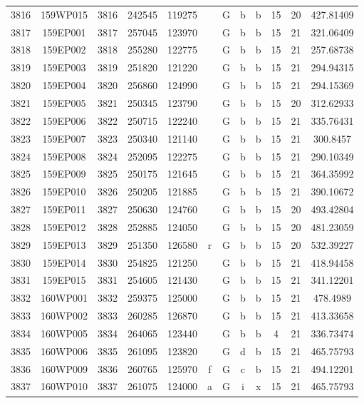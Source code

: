 \begin{tabular}{|*{12}{c|}}
3816 & 159WP015 & 3816 & 242545 & 119275 &  & G & b & b & 15 & 20 & 427.81409 \\ 
3817 & 159EP001 & 3817 & 257045 & 123970 &  & G & b & b & 15 & 21 & 321.06409 \\ 
3818 & 159EP002 & 3818 & 255280 & 122775 &  & G & b & b & 15 & 21 & 257.68738 \\ 
3819 & 159EP003 & 3819 & 251820 & 121220 &  & G & b & b & 15 & 21 & 294.94315 \\ 
3820 & 159EP004 & 3820 & 256860 & 124990 &  & G & b & b & 15 & 21 & 294.15369 \\ 
3821 & 159EP005 & 3821 & 250345 & 123790 &  & G & b & b & 15 & 20 & 312.62933 \\ 
3822 & 159EP006 & 3822 & 250715 & 122240 &  & G & b & b & 15 & 21 & 335.76431 \\ 
3823 & 159EP007 & 3823 & 250340 & 121140 &  & G & b & b & 15 & 21 & 300.8457 \\ 
3824 & 159EP008 & 3824 & 252095 & 122275 &  & G & b & b & 15 & 21 & 290.10349 \\ 
3825 & 159EP009 & 3825 & 250175 & 121645 &  & G & b & b & 15 & 21 & 364.35992 \\ 
3826 & 159EP010 & 3826 & 250205 & 121885 &  & G & b & b & 15 & 21 & 390.10672 \\ 
3827 & 159EP011 & 3827 & 250630 & 124760 &  & G & b & b & 15 & 20 & 493.42804 \\ 
3828 & 159EP012 & 3828 & 252885 & 124050 &  & G & b & b & 15 & 20 & 481.23059 \\ 
3829 & 159EP013 & 3829 & 251350 & 126580 & r & G & b & b & 15 & 20 & 532.39227 \\ 
3830 & 159EP014 & 3830 & 254825 & 121250 &  & G & b & b & 15 & 21 & 418.94458 \\ 
3831 & 159EP015 & 3831 & 254605 & 121430 &  & G & b & b & 15 & 21 & 341.12201 \\ 
3832 & 160WP001 & 3832 & 259375 & 125000 &  & G & b & b & 15 & 21 & 478.4989 \\ 
3833 & 160WP002 & 3833 & 260285 & 126870 &  & G & b & b & 15 & 21 & 413.33658 \\ 
3834 & 160WP005 & 3834 & 264065 & 123440 &  & G & b & b & 4 & 21 & 336.73474 \\ 
3835 & 160WP006 & 3835 & 261095 & 123820 &  & G & d & b & 15 & 21 & 465.75793 \\ 
3836 & 160WP009 & 3836 & 260765 & 125970 & f & G & c & b & 15 & 21 & 494.12201 \\ 
3837 & 160WP010 & 3837 & 261075 & 124000 & a & G & i & x & 15 & 21 & 465.75793 \\ 

\end{tabular}
